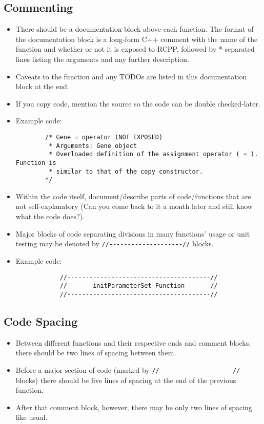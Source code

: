 \documentclass[letter,10pt]{article}
\begin{document}
\subsection{Commenting}
\begin{itemize}
    \item
        There should be a documentation block above each function. The format of the documentation
        block is a long-form C++ comment with the name of the function and whether or not it is
        exposed to RCPP, followed by *-separated lines listing the arguments and any further
        description.
    \item Caveats to the function and any TODOs are listed in this documentation block at the end.
    \item If you copy code, mention the source so the code can be double checked-later.
    \item Example code:
    \begin{lstlisting}
        /* Gene = operator (NOT EXPOSED)
         * Arguments: Gene object
         * Overloaded definition of the assignment operator ( = ). Function is
         * similar to that of the copy constructor.
        */
    \end{lstlisting}
    \item Within the code itself, document/describe parts of code/functions 
    that are not self-explanatory
    (Can you come back to it a month later and still know what the code does?).
    \item Major blocks of code separating divisions in many functions' usage or unit testing
    may be denoted by \verb+//--------------------//+ blocks.
    \item Example code:
    \begin{lstlisting}
            //---------------------------------------//
            //------ initParameterSet Function ------//
            //---------------------------------------//
    \end{lstlisting}
\end{itemize}

\subsection{Code Spacing}
\begin{itemize}
    \item
    Between different functions and their respective ends and comment blocks, 
    there should be two lines of spacing between them.
    \item 
    Before a major section of code (marked by \verb+//--------------------//+ blocks)
    there should be five lines of spacing at the end of the previous function.
    \item After that comment block, however, there may be only two lines of spacing like usual.
\end{itemize}
\end{document}
